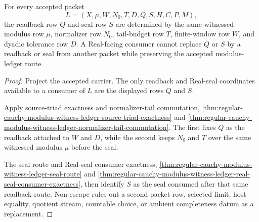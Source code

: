 \begin{theorem}
\label{thm:regular-cauchy-modulus-witness-ledger-readback-seal-determinacy}
For every accepted packet
$$
L=(X,\mu,W,N_0,T,D,Q,S,H,C,P,M),
$$
the readback row $Q$ and seal row $S$ are determined by the same witnessed modulus row $\mu$, normalizer row $N_0$, tail-budget row $T$, finite-window row $W$, and dyadic tolerance row $D$. A Real-facing consumer cannot replace $Q$ or $S$ by a readback or seal from another packet while preserving the accepted modulus-ledger route.
\end{theorem}
\begin{proof}
Project the accepted carrier. The only readback and Real-seal coordinates available to a consumer of $L$ are the displayed rows $Q$ and $S$.

Apply source-triad exactness and normalizer-tail commutation, \autoref{thm:regular-cauchy-modulus-witness-ledger-source-triad-exactness} and \autoref{thm:regular-cauchy-modulus-witness-ledger-normalizer-tail-commutation}. The first fixes $Q$ as the readback attached to $W$ and $D$, while the second keeps $N_0$ and $T$ over the same witnessed modulus $\mu$ before the seal.

The seal route and Real-seal consumer exactness, \autoref{thm:regular-cauchy-modulus-witness-ledger-seal-route} and \autoref{thm:regular-cauchy-modulus-witness-ledger-real-seal-consumer-exactness}, then identify $S$ as the seal consumed after that same readback route. Non-escape rules out a second packet row, selected limit, host equality, quotient stream, countable choice, or ambient completeness datum as a replacement.
\end{proof}

